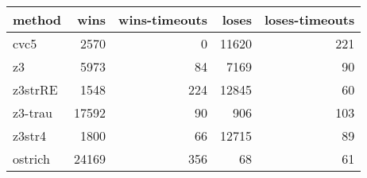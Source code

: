 \begin{tabular}{lrrrr}
\hline
 method   &   wins &   wins-timeouts &   loses &   loses-timeouts \\
\hline
 cvc5     &   2570 &               0 &   11620 &              221 \\
 z3       &   5973 &              84 &    7169 &               90 \\
 z3strRE  &   1548 &             224 &   12845 &               60 \\
 z3-trau  &  17592 &              90 &     906 &              103 \\
 z3str4   &   1800 &              66 &   12715 &               89 \\
 ostrich  &  24169 &             356 &      68 &               61 \\
\hline
\end{tabular}
